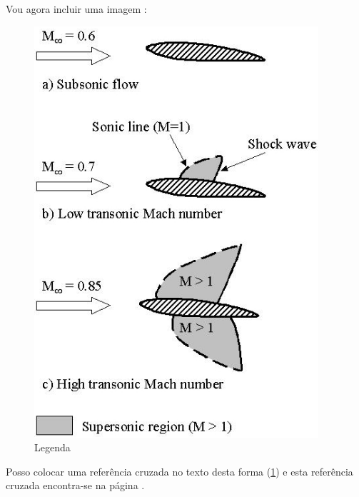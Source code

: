 Vou agora incluir uma imagem :
\begin{figure}[!htbp]
  \begin{center}
    \leavevmode
    \ifpdf
      \includegraphics[height=6in]{aflow}
    \fi
    \caption{Legenda}
    \label{FigAir}
  \end{center}
\end{figure}

Posso colocar uma referência cruzada no texto desta forma (\ref{FigAir}) e esta referência cruzada encontra-se na página \pageref{FigAir}. 

